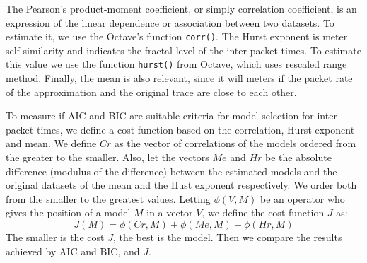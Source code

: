The Pearson's product-moment coefficient, or simply correlation coefficient,  is an expression of the linear dependence or association between two datasets. To estimate it, we use the Octave's function \texttt{corr()}. The Hurst exponent is meter self-similarity and indicates the fractal level of the inter-packet times.  To estimate this value we use the function \texttt{hurst()} from Octave, which uses rescaled range method. Finally, the mean is also relevant, since it will meters if the packet rate of the approximation and the original trace are close to each other. 

To measure if AIC and BIC are suitable criteria for model selection for inter-packet times, we define a cost function based on the correlation, Hurst exponent and mean. We define $Cr$ as the vector of correlations of the models ordered from the greater to the smaller. Also, let the vectors $Me$ and $Hr$ be the absolute difference (modulus of the difference) between the estimated models and the original datasets of the mean and the Hust exponent respectively. We order both from the smaller to the greatest values. Letting $\phi(V, M)$ be an operator who gives the position of a model $M$ in a vector $V$, we define the cost function $J$ as:
\begin{equation}
J(M) = \phi(Cr, M) + \phi(Me, M) + \phi(Hr, M)
\end{equation}
The smaller is the cost $J$, the best is the model. Then we compare the results achieved by AIC and BIC, and $J$.


